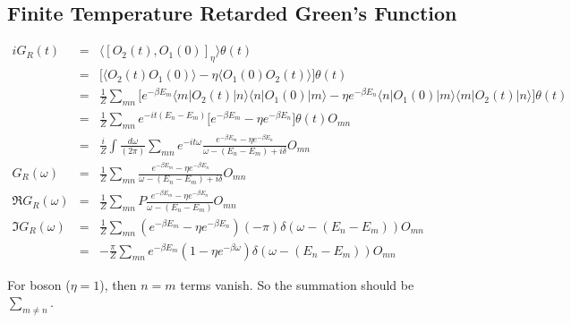 \documentclass[12pt]{book}
\begin{document}
	\subsection{Finite Temperature Retarded Green's Function}
	\begin{eqnarray}
		iG_R(t)&=&\langle [O_2(t),O_1(0)]_\eta\rangle\theta(t)\\
		&=&\big[\langle O_2(t)O_1(0)\rangle-\eta\langle O_1(0)O_2(t)\rangle\big]\theta(t)\\
		&=&\frac 1Z\sum_{mn}\big[e^{-\beta E_m}\langle m|O_2(t)|n\rangle\langle n|O_1(0)|m\rangle-\eta e^{-\beta E_n}\langle n|O_1(0)|m\rangle\langle m|O_2(t)|n\rangle\big]\theta(t)\\
		&=&\frac 1Z\sum_{mn}e^{-it(E_n-E_m)}\big[e^{-\beta E_m}-\eta e^{-\beta E_n}\big]\theta(t)O_{mn}\\
		&=&\frac iZ\int\frac{d\omega}{(2\pi)}\sum_{mn}e^{-it\omega}\frac{e^{-\beta E_m}-\eta e^{-\beta E_n}}{\omega-(E_n-E_m)+i\delta}O_{mn}\\
		G_R(\omega)&=&\frac 1Z\sum_{mn}\frac{e^{-\beta E_m}-\eta e^{-\beta E_n}}{\omega-(E_n-E_m)+i\delta}O_{mn}\\
		\Re G_R(\omega)&=&\frac 1Z\sum_{mn}P\frac{e^{-\beta E_m}-\eta e^{-\beta E_n}}{\omega-(E_n-E_m)}O_{mn}\\
		\Im G_R(\omega)&=&\frac 1Z\sum_{mn}(e^{-\beta E_m}-\eta e^{-\beta E_n})(-\pi)\delta(\omega-(E_n-E_m))O_{mn}\\
		&=&-\frac\pi Z\sum_{mn}e^{-\beta E_m}(1-\eta e^{-\beta\omega})\delta(\omega-(E_n-E_m))O_{mn}
	\end{eqnarray}
	
	For boson ($\eta=1$), then $n=m$ terms vanish. So the summation should be $\sum_{m\neq n}$.
\end{document}
